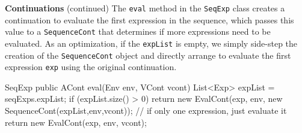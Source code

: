\begin{minipage}[t]{\sw}
\slidenumber
\LARGE
{\bf Continuations} (continued)\exx
The \verb'eval' method in the \verb'SeqExp' class
creates a continuation to evaluate the first expression
in the sequence,
which passes this value to a \verb'SequenceCont'
that determines if more expressions need to be evaluated.
As an optimization,
if the \verb'expList' is empty,
we simply side-step the creation of the \verb'SequenceCont' object
and directly arrange to evaluate the first expression \verb'exp'
using the original continuation.
\Large
\begin{qv}
SeqExp
    public ACont eval(Env env, VCont vcont) {
        List<Exp> expList = seqExps.expList;
        if (expList.size() > 0)
            return new EvalCont(exp,
                                env,
                                new SequenceCont(expList,env,vcont));
        // if only one expression, just evaluate it
        return new EvalCont(exp, env, vcont);
    }
\end{qv}
\end{minipage}
